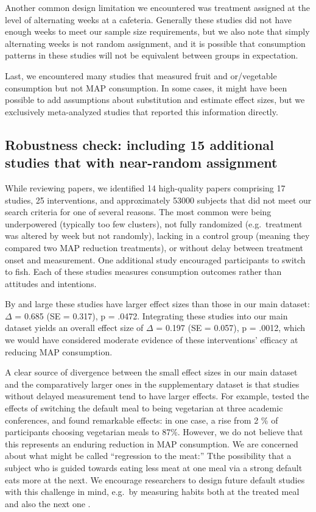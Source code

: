 \documentclass[sn-nature,pdflatex]{sn-jnl}
\begin{document}
Another common design limitation we encountered was treatment assigned
at the level of alternating weeks at a cafeteria. Generally these
studies did not have enough weeks to meet our sample size requirements,
but we also note that simply alternating weeks is not random assignment,
and it is possible that consumption patterns in these studies will not
be equivalent between groups in expectation.

Last, we encountered many studies that measured fruit and or/vegetable
consumption but not MAP consumption. In some cases, it might have been
possible to add assumptions about substitution and estimate effect
sizes, but we exclusively meta-analyzed studies that reported this
information directly.

\subsection{Robustness check: including 15 additional studies that with
near-random
assignment}\label{robustness-check-including-15-additional-studies-that-with-near-random-assignment}

While reviewing papers, we identified 14 high-quality papers comprising
17 studies, 25 interventions, and approximately 53000 subjects that did
not meet our search criteria for one of several reasons. The most common
were being underpowered (typically too few clusters), not fully
randomized (e.g.~treatment was altered by week but not randomly),
lacking in a control group (meaning they compared two MAP reduction
treatments), or without delay between treatment onset and measurement.
One additional study encouraged participants to switch to fish. Each of
these studies measures consumption outcomes rather than attitudes and
intentions.

By and large these studies have larger effect sizes than those in our
main dataset: \(\Delta\) = 0.685 (SE = 0.317), p = .0472. Integrating
these studies into our main dataset yields an overall effect size of
\(\Delta\) = 0.197 (SE = 0.057), p = .0012, which we would have
considered moderate evidence of these interventions' efficacy at
reducing MAP consumption.

A clear source of divergence between the small effect sizes in our main
dataset and the comparatively larger ones in the supplementary dataset
is that studies without delayed measurement tend to have larger effects.
For example, \citep{hansen2021} tested the effects of switching the
default meal to being vegetarian at three academic conferences, and
found remarkable effects: in one case, a rise from 2 \% of participants
choosing vegetarian meals to 87\%. However, we do not believe that this
represents an enduring reduction in MAP consumption. We are concerned
about what might be called ``regression to the meat:'' Tthe possibility
that a subject who is guided towards eating less meat at one meal via a
strong default eats more at the next. We encourage researchers to design
future default studies with this challenge in mind, e.g.~by measuring
habits both at the treated meal and also the next one
\citep{vocski2024}.
\end{document}
